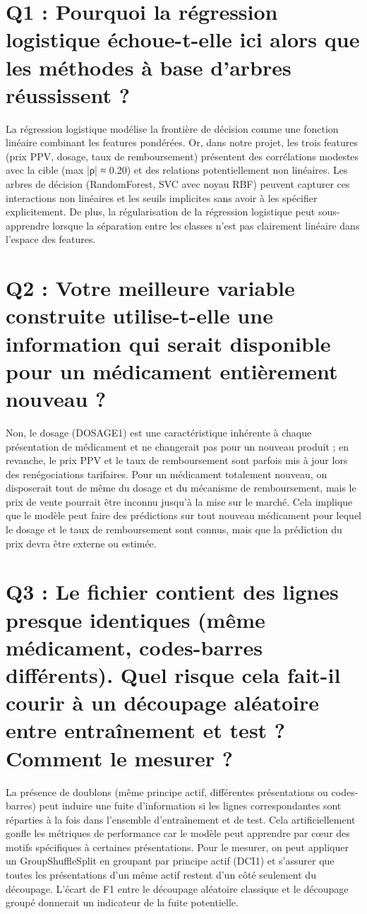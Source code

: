 \documentclass[12pt,a4paper]{report}
\begin{document}
\section{Q1 : Pourquoi la régression logistique échoue-t-elle ici alors que les méthodes à base d'arbres réussissent ?}
La régression logistique modélise la frontière de décision comme une fonction linéaire combinant les features pondérées. Or, dans notre projet, les trois features (prix PPV, dosage, taux de remboursement) présentent des corrélations modestes avec la cible (max |ρ| ≈ 0.20) et des relations potentiellement non linéaires. Les arbres de décision (RandomForest, SVC avec noyau RBF) peuvent capturer ces interactions non linéaires et les seuils implicites sans avoir à les spécifier explicitement. De plus, la régularisation de la régression logistique peut sous-apprendre lorsque la séparation entre les classes n'est pas clairement linéaire dans l'espace des features.

\section{Q2 : Votre meilleure variable construite utilise-t-elle une information qui serait disponible pour un médicament entièrement nouveau ?}
Non, le dosage (DOSAGE1) est une caractéristique inhérente à chaque présentation de médicament et ne changerait pas pour un nouveau produit ; en revanche, le prix PPV et le taux de remboursement sont parfois mis à jour lors des renégociations tarifaires. Pour un médicament totalement nouveau, on disposerait tout de même du dosage et du mécanisme de remboursement, mais le prix de vente pourrait être inconnu jusqu'à la mise sur le marché. Cela implique que le modèle peut faire des prédictions sur tout nouveau médicament pour lequel le dosage et le taux de remboursement sont connus, mais que la prédiction du prix devra être externe ou estimée.

\section{Q3 : Le fichier contient des lignes presque identiques (même médicament, codes-barres différents). Quel risque cela fait-il courir à un découpage aléatoire entre entraînement et test ? Comment le mesurer ?}
La présence de doublons (même principe actif, différentes présentations ou codes-barres) peut induire une fuite d'information si les lignes correspondantes sont réparties à la fois dans l'ensemble d'entraînement et de test. Cela artificiellement gonfle les métriques de performance car le modèle peut apprendre par cœur des motifs spécifiques à certaines présentations. Pour le mesurer, on peut appliquer un GroupShuffleSplit en groupant par principe actif (DCI1) et s'assurer que toutes les présentations d'un même actif restent d'un côté seulement du découpage. L'écart de F1 entre le découpage aléatoire classique et le découpage groupé donnerait un indicateur de la fuite potentielle.
\end{document}
